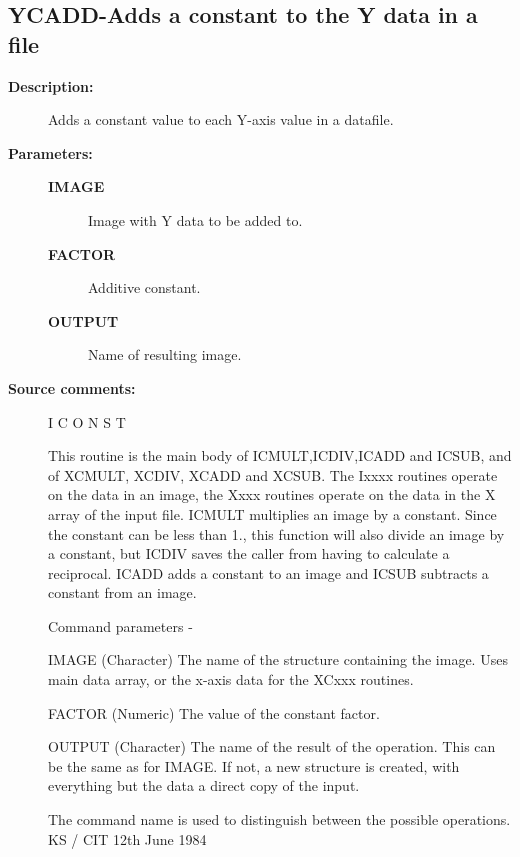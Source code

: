 \subsection{YCADD-\label{YCADD}Adds a constant to the Y data in a file}
\begin{description}

\item [\textbf{Description:}]
 Adds a constant value to each Y-axis value in a datafile.

\item [\textbf{Parameters:}]
\begin{description}
\item [\textbf{IMAGE}]
 Image with Y data to be added to.
\item [\textbf{FACTOR}]
 Additive constant.
\item [\textbf{OUTPUT}]
 Name of resulting image.
\end{description}

\item [\textbf{Source comments:}]
\begin{terminalv}
 I C O N S T

 This routine is the main body of ICMULT,ICDIV,ICADD and ICSUB,
 and of XCMULT, XCDIV, XCADD and XCSUB.  The Ixxxx routines
 operate on the data in an image, the Xxxx routines operate on
 the data in the X array of the input file.
 ICMULT multiplies an image by a constant.  Since the constant
 can be less than 1., this function will also divide an
 image by a constant, but ICDIV saves the caller from having
 to calculate a reciprocal. ICADD adds a constant to an image and
 ICSUB subtracts a constant from an image.

 Command parameters -

 IMAGE  (Character) The name of the structure containing the image.
        Uses main data array, or the x-axis data for the XCxxx routines.

 FACTOR (Numeric) The value of the constant factor.

 OUTPUT (Character) The name of the result of the operation.  This
        can be the same as for IMAGE.  If not, a new structure
        is created, with everything but the data a direct
        copy of the input.

 The command name is used to distinguish between the
 possible operations.
                                  KS / CIT 12th June 1984
\end{terminalv}
\end{description}
